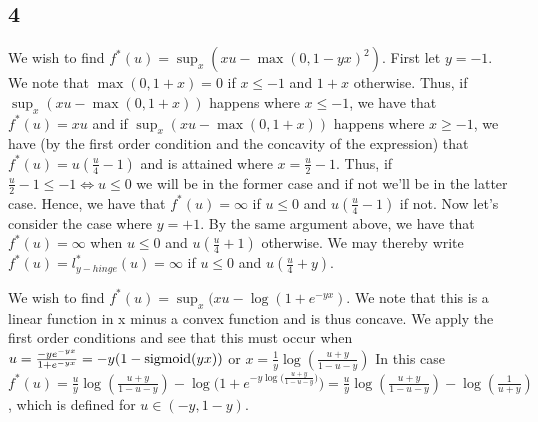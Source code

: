 \documentclass[12pt]{article}
\begin{document}
\subsection{4}
We wish to find $f^*(u) = \sup_x (xu - \max(0, 1-yx)^2)$. First let $y=-1$. We note that $\max(0, 1+x) = 0$ if $x\leq -1$ and $1+x$ otherwise. Thus, if $\sup_x (xu-\max(0,1+x))$ happens where $x \leq -1$, we have that $f^*(u) = xu$ and if $\sup_x (xu-\max(0,1+x))$ happens where $x \geq -1$, we have (by the first order condition and the concavity of the expression) that $f^*(u) = u(\frac{u}{4} -1)$ and is attained where $x = \frac{u}{2} -1$. Thus, if $\frac{u}{2} -1 \leq -1 \iff u\leq 0$ we will be in the former case and if not we'll be in the latter case. Hence, we have that $f^*(u) = \infty $ if $u \leq 0$ and $u(\frac{u}{4}-1)$ if not. Now let's consider the case where $y=+1$. By the same argument above, we have that $f^*(u) = \infty$ when $u \leq 0$ and $u(\frac{u}{4} + 1)$ otherwise. We may thereby write $f^*(u) = l_{y-hinge}^*(u) = \infty$ if $u\leq 0$ and $u(\frac{u}{4} + y)$.

We wish to find $f^*(u) = \sup_x(xu - \log(1+e^{-yx})$. We note that this is a linear function in x minus a convex function and is thus concave. We apply the first order conditions and see that this must occur when $u = \frac{-y e^{-yx}}{1+e^{-yx}}  = -y(1-\textnormal{sigmoid}(yx))$ or $x = \frac{1}{y} \log (\frac{u+y}{1-u-y})$ In this case $f^*(u) = \frac{u}{y}\log (\frac{u+y}{1-u-y}) - \log \big(1+ e^{-y\log \big(\frac{u+y}{1-u-y}\big)}\big) = \frac{u}{y} \log(\frac{u+y}{1-u-y}) - \log (\frac{1}{u+y})$, which is defined for $u \in (-y, 1-y)$. 
\end{document}
